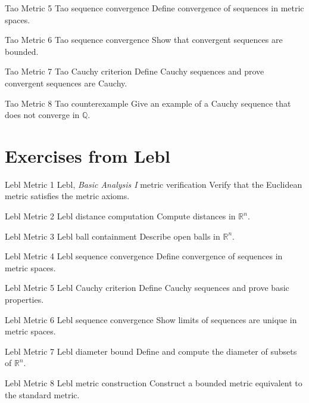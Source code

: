 \exstub
{Tao Metric 5}
{Tao}
{sequence convergence}
{Define convergence of sequences in metric spaces.}

\exstub
{Tao Metric 6}
{Tao}
{sequence convergence}
{Show that convergent sequences are bounded.}

\exstub
{Tao Metric 7}
{Tao}
{Cauchy criterion}
{Define Cauchy sequences and prove convergent sequences are Cauchy.}

\exstub
{Tao Metric 8}
{Tao}
{counterexample}
{Give an example of a Cauchy sequence that does not converge
in $\mathbb Q$.}


\section*{Exercises from Lebl}

\exstub
{Lebl Metric 1}
{Lebl, \textit{Basic Analysis I}}
{metric verification}
{Verify that the Euclidean metric satisfies the metric axioms.}

\exstub
{Lebl Metric 2}
{Lebl}
{distance computation}
{Compute distances in $\mathbb R^n$.}

\exstub
{Lebl Metric 3}
{Lebl}
{ball containment}
{Describe open balls in $\mathbb R^n$.}

\exstub
{Lebl Metric 4}
{Lebl}
{sequence convergence}
{Define convergence of sequences in metric spaces.}

\exstub
{Lebl Metric 5}
{Lebl}
{Cauchy criterion}
{Define Cauchy sequences and prove basic properties.}

\exstub
{Lebl Metric 6}
{Lebl}
{sequence convergence}
{Show limits of sequences are unique in metric spaces.}

\exstub
{Lebl Metric 7}
{Lebl}
{diameter bound}
{Define and compute the diameter of subsets of $\mathbb R^n$.}

\exstub
{Lebl Metric 8}
{Lebl}
{metric construction}
{Construct a bounded metric equivalent to the standard metric.}
